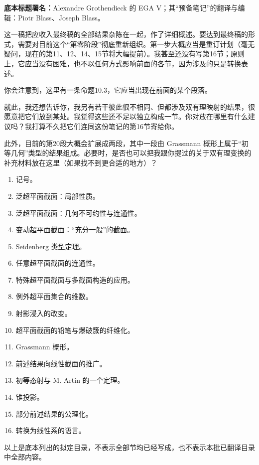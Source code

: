 \noindent\textbf{底本标题署名：}Alexandre Grothendieck 的 EGA V；其“预备笔记”的翻译与编辑：Piotr Blass、Joseph Blass。

这一稿把应收入最终稿的全部结果杂陈在一起，作了详细概述。要达到最终稿的形式，需要对目前这个“第零阶段”彻底重新组织。第一步大概应当是重订计划（毫无疑问，现在的第11、12、14、15节将大幅提前）。我甚至还没有写第16节；原则上，它应当没有困难，也不以任何方式影响前面的各节，因为涉及的只是转换表述。

你会注意到，这里有一条命题10.3，它应当出现在前面的某个段落。

就此，我还想告诉你，我另有若干彼此很不相同、但都涉及双有理映射的结果，很愿意把它们放到某处。我觉得这些还不足以独立构成一节。你对放在哪里有什么建议吗？我打算不久把它们连同这份笔记的第16节寄给你。

此外，目前的第20段大概会扩展成两段，其中一段由 Grassmann 概形上属于“初等几何”类型的结果组成。必要时，是否也可以把我跟你提过的关于双有理变换的补充材料放在这里（如果找不到更合适的地方）？

\begin{enumerate}[label=\arabic*)]
\item 记号。
\item 泛超平面截面：局部性质。
\item 泛超平面截面：几何不可约性与连通性。
\item 变动超平面截面：“充分一般”的截面。
\item Seidenberg 类型定理。
\item 任意超平面截面的连通性。
\item 特殊超平面截面与多截面构造的应用。
\item 例外超平面集合的维数。
\item 射影浸入的改变。
\item 超平面截面的铅笔与爆破簇的纤维化。
\item Grassmann 概形。
\item 前述结果向线性截面的推广。
\item 初等态射与 M. Artin 的一个定理。
\item 锥投影。
\item 部分前述结果的公理化。
\item 转换为线性系的语言。
\end{enumerate}
以上是底本列出的拟定目录，不表示全部节均已经写成，也不表示本批已翻译目录中全部内容。

